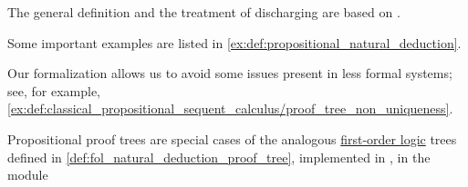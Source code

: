 \begin{comments}
  \item The general definition and the treatment of discharging are based on \cite[\S 2.1]{TroelstraSchwichtenberg2000BasicProofTheory}.

  \item Some important examples are listed in \cref{ex:def:propositional_natural_deduction}.

  \item Our formalization allows us to avoid some issues present in less formal systems; see, for example, \cref{ex:def:classical_propositional_sequent_calculus/proof_tree_non_uniqueness}.

  \item Propositional proof trees are special cases of the analogous \hyperref[def:first_order_logic]{first-order logic} trees defined in \cref{def:fol_natural_deduction_proof_tree}, implemented in \cite{notebook:code}, in the module
  \begin{CodeRefDisplay}
  \end{CodeRefDisplay}
\end{comments}

